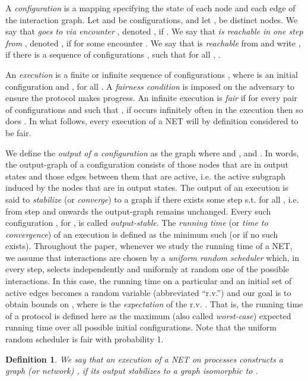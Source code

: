 \documentclass[preprint]{elsarticle}
\newtheorem{definition}{Definition}
\begin{document}
A \emph{configuration} is a mapping  specifying the state of each node and each edge of the interaction graph. Let  and  be configurations, and let ,  be distinct nodes. We say that \emph{ goes to  via encounter }, denoted , if      . We say that \emph{ is reachable in one step from }, denoted , if  for some encounter . We say that  is \emph{reachable} from  and write , if there is a sequence of configurations , such that  for all , .

An \emph{execution} is a finite or infinite sequence of configurations  , where  is an initial configuration and , for all . A \emph{fairness condition} is imposed on the adversary to ensure the protocol makes progress. An infinite execution is \emph{fair} if for every pair of configurations  and  such that , if  occurs infinitely often in the execution then so does . In what follows, every execution of a NET will by definition considered to be fair.

We define the \emph{output of a configuration}  as the graph  where  and  , and . In words, the output-graph of a configuration consists of those nodes that are in output states and those edges between them that are active, i.e. the active subgraph induced by the nodes that are in output states. The output of an execution  is said to \emph{stabilize} (or \emph{converge}) to a graph  if there exists some step  s.t.  for all , i.e. from step  and onwards the output-graph remains unchanged. Every such configuration , for , is called \emph{output-stable}. The \emph{running time} (or \emph{time to convergence}) of an execution is defined as the minimum such  (or  if no such  exists). Throughout the paper, whenever we study the running time of a NET, we assume that interactions are chosen by a \emph{uniform random scheduler} which, in every step, selects independently and uniformly at random one of the  possible interactions. In this case, the running time on a particular  and an initial set of active edges  becomes a random variable (abbreviated ``r.v.'')  and our goal is to obtain bounds on , where  is the \emph{expectation} of the r.v. . That is, the running time of a protocol is defined here as the maximum (also called \emph{worst-case}) expected running time over all possible initial configurations. Note that the uniform random scheduler is fair with probability 1.

\begin{definition}
We say that an execution of a NET on  processes \emph{constructs a graph} (or \emph{network}) , if its output stabilizes to a graph isomorphic to .
\end{definition}
\end{document}
